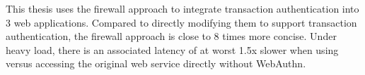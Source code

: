 
This thesis uses the firewall approach to integrate transaction authentication into 3 web applications. Compared to directly modifying them to support transaction authentication, the firewall approach is close to 8 times more concise. Under heavy load, there is an associated latency of at worst 1.5x slower when using \sys{} versus accessing the original web service directly without WebAuthn.


